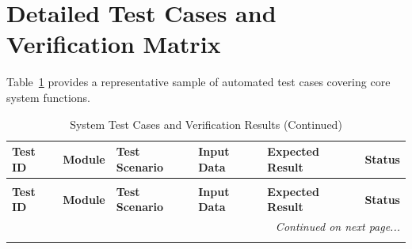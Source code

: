 \section{Detailed Test Cases and Verification Matrix}
Table~\ref{tab:test_cases_table} provides a representative sample of automated test cases covering core system functions.

\begin{longtable}{lp{2.4cm}p{3.2cm}p{3.0cm}p{3.2cm}c}
\caption{System Test Cases and Verification Results} \label{tab:test_cases_table} \\
\toprule
\textbf{Test ID} & \textbf{Module} & \textbf{Test Scenario} & \textbf{Input Data} & \textbf{Expected Result} & \textbf{Status} \\
\midrule
\endfirsthead
\caption[]{System Test Cases and Verification Results (Continued)} \\
\toprule
\textbf{Test ID} & \textbf{Module} & \textbf{Test Scenario} & \textbf{Input Data} & \textbf{Expected Result} & \textbf{Status} \\
\midrule
\endhead
\midrule
\multicolumn{6}{r}{\textit{Continued on next page...}} \\
\bottomrule
\endfoot
\bottomrule
\endlastfoot


\end{longtable}
